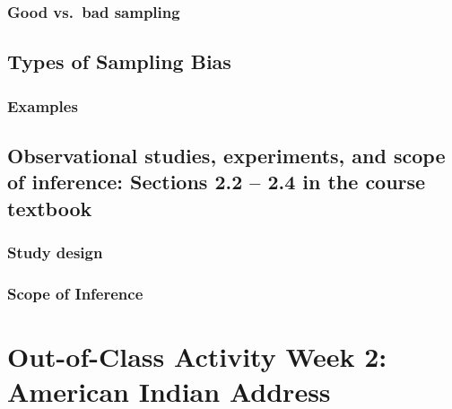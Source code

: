 \documentclass[
]{report}
\begin{document}
\hypertarget{good-vs.-bad-sampling}{%
\subsubsection*{Good vs.~bad sampling}\label{good-vs.-bad-sampling}}

\hypertarget{types-of-sampling-bias}{%
\subsection*{Types of Sampling Bias}\label{types-of-sampling-bias}}

\hypertarget{examples}{%
\subsubsection*{Examples}\label{examples}}

\hypertarget{observational-studies-experiments-and-scope-of-inference-sections-2.2-2.4-in-the-course-textbook}{%
\subsection*{Observational studies, experiments, and scope of inference: Sections 2.2 -- 2.4 in the course textbook}\label{observational-studies-experiments-and-scope-of-inference-sections-2.2-2.4-in-the-course-textbook}}

\hypertarget{study-design-1}{%
\subsubsection*{Study design}\label{study-design-1}}

\hypertarget{scope-of-inference}{%
\subsubsection*{Scope of Inference}\label{scope-of-inference}}

\hypertarget{out-of-class-activity-week-2-american-indian-address}{%
\section{Out-of-Class Activity Week 2: American Indian Address}\label{out-of-class-activity-week-2-american-indian-address}}
\end{document}
